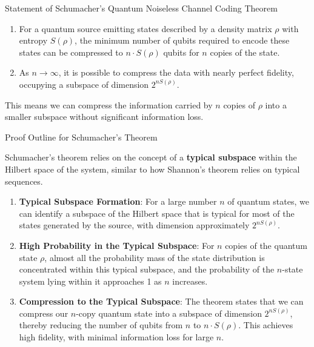 \begin{frame}{Statement of Schumacher's Quantum Noiseless Channel Coding Theorem}

\begin{enumerate}
    \item For a quantum source emitting states described by a density matrix \( \rho \) with entropy \( S(\rho) \), the minimum number of qubits required to encode these states can be compressed to \( n \cdot S(\rho) \) qubits for \( n \) copies of the state.
    \item As \( n \to \infty \), it is possible to compress the data with nearly perfect fidelity, occupying a subspace of dimension \( 2^{n S(\rho)} \).
\end{enumerate}

This means we can compress the information carried by \( n \) copies of \( \rho \) into a smaller subspace without significant information loss.
\end{frame}

\begin{frame}{Proof Outline for Schumacher's Theorem}

Schumacher's theorem relies on the concept of a \textbf{typical subspace} within the Hilbert space of the system, similar to how Shannon's theorem relies on typical sequences.

\begin{enumerate}
    \item \textbf{Typical Subspace Formation}: For a large number \( n \) of quantum states, we can identify a subspace of the Hilbert space that is typical for most of the states generated by the source, with dimension approximately \( 2^{n S(\rho)} \).
    \item \textbf{High Probability in the Typical Subspace}: For \( n \) copies of the quantum state \( \rho \), almost all the probability mass of the state distribution is concentrated within this typical subspace, and the probability of the \( n \)-state system lying within it approaches 1 as \( n \) increases.
    \item \textbf{Compression to the Typical Subspace}: The theorem states that we can compress our \( n \)-copy quantum state into a subspace of dimension \( 2^{n S(\rho)} \), thereby reducing the number of qubits from \( n \) to \( n \cdot S(\rho) \). This achieves high fidelity, with minimal information loss for large \( n \).
\end{enumerate}
\end{frame}
